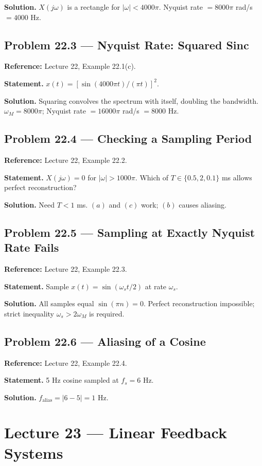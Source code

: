 \documentclass[11pt]{article}
\begin{document}
\textbf{Solution.} $X(j\omega)$ is a rectangle for $|\omega|<4000\pi$. Nyquist rate $=8000\pi$ rad/s $=4000$ Hz.

\subsection{Problem 22.3 --- Nyquist Rate: Squared Sinc}
\textbf{Reference:} Lecture 22, Example 22.1(c).

\textbf{Statement.} $x(t) = [\sin(4000\pi t)/(\pi t)]^2$.

\textbf{Solution.} Squaring convolves the spectrum with itself, doubling the bandwidth. $\omega_M = 8000\pi$; Nyquist rate $= 16000\pi$ rad/s $= 8000$ Hz.

\subsection{Problem 22.4 --- Checking a Sampling Period}
\textbf{Reference:} Lecture 22, Example 22.2.

\textbf{Statement.} $X(j\omega)=0$ for $|\omega|>1000\pi$. Which of $T\in\{0.5,2,0.1\}$ ms allows perfect reconstruction?

\textbf{Solution.} Need $T<1$ ms. $(a)$ and $(c)$ work; $(b)$ causes aliasing.

\subsection{Problem 22.5 --- Sampling at Exactly Nyquist Rate Fails}
\textbf{Reference:} Lecture 22, Example 22.3.

\textbf{Statement.} Sample $x(t) = \sin(\omega_s t/2)$ at rate $\omega_s$.

\textbf{Solution.} All samples equal $\sin(\pi n) = 0$. Perfect reconstruction impossible; strict inequality $\omega_s>2\omega_M$ is required.

\subsection{Problem 22.6 --- Aliasing of a Cosine}
\textbf{Reference:} Lecture 22, Example 22.4.

\textbf{Statement.} 5 Hz cosine sampled at $f_s = 6$ Hz.

\textbf{Solution.} $f_\text{alias} = |6-5| = 1$ Hz.

\section{Lecture 23 --- Linear Feedback Systems}
\end{document}

